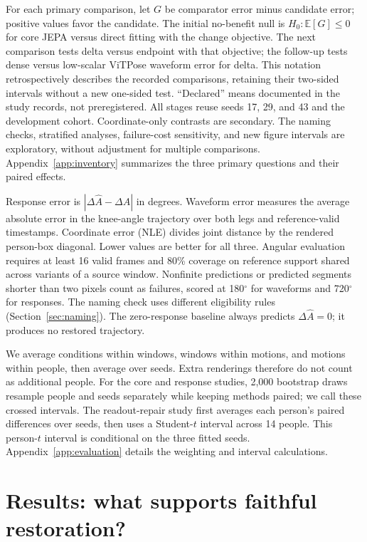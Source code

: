 \documentclass{article}
\newcommand{\dg}{^{\circ}}
\newcommand{\E}{\mathbb{E}}
\begin{document}
For each primary comparison, let $G$ be comparator error minus candidate error; positive values favor the candidate. The initial no-benefit null is $H_0:\E[G]\leq0$ for core JEPA versus direct fitting with the change objective. The next comparison tests delta versus endpoint with that objective; the follow-up tests dense versus low-scalar ViTPose waveform error for delta. This notation retrospectively describes the recorded comparisons, retaining their two-sided intervals without a new one-sided test. ``Declared'' means documented in the study records, not preregistered. All stages reuse seeds 17, 29, and 43 and the development cohort. Coordinate-only contrasts are secondary. The naming checks, stratified analyses, failure-cost sensitivity, and new figure intervals are exploratory, without adjustment for multiple comparisons. Appendix~\ref{app:inventory} summarizes the three primary questions and their paired effects.

Response error is $|\Delta\widehat A-\Delta A|$ in degrees. Waveform error measures the average absolute error in the knee-angle trajectory over both legs and reference-valid timestamps. Coordinate error (NLE) divides joint distance by the rendered person-box diagonal. Lower values are better for all three. Angular evaluation requires at least 16 valid frames and 80\% coverage on reference support shared across variants of a source window. Nonfinite predictions or predicted segments shorter than two pixels count as failures, scored at 180$\dg$ for waveforms and 720$\dg$ for responses. The naming check uses different eligibility rules (Section~\ref{sec:naming}). The zero-response baseline always predicts $\Delta\widehat A=0$; it produces no restored trajectory.

We average conditions within windows, windows within motions, and motions within people, then average over seeds. Extra renderings therefore do not count as additional people. For the core and response studies, 2,000 bootstrap draws resample people and seeds separately while keeping methods paired; we call these crossed intervals. The readout-repair study first averages each person's paired differences over seeds, then uses a Student-$t$ interval across 14 people. This person-$t$ interval is conditional on the three fitted seeds. Appendix~\ref{app:evaluation} details the weighting and interval calculations.

\section{Results: what supports faithful restoration?}
\end{document}
